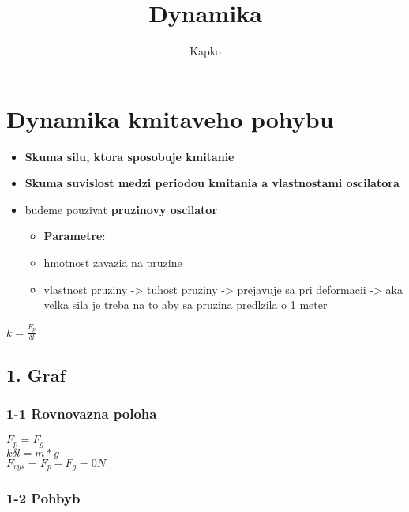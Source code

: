 \documentclass[
]{article}
\title{Dynamika}
\author{Kapko}
\date{}
\providecommand{\tightlist}{%
  \setlength{\itemsep}{0pt}\setlength{\parskip}{0pt}}
\begin{document}
\maketitle

\hypertarget{dynamika-kmitaveho-pohybu}{%
\section{Dynamika kmitaveho pohybu}\label{dynamika-kmitaveho-pohybu}}

\begin{itemize}
\tightlist
\item
  \textbf{Skuma silu, ktora sposobuje kmitanie}
\item
  \textbf{Skuma suvislost medzi periodou kmitania a vlastnostami
  oscilatora}
\item
  budeme pouzivat \textbf{pruzinovy oscilator}

  \begin{itemize}
  \tightlist
  \item
    \textbf{Parametre}:
  \item
    hmotnost zavazia na pruzine
  \item
    vlastnost pruziny -\textgreater{} tuhost pruziny -\textgreater{}
    prejavuje sa pri deformacii -\textgreater{} aka velka sila je treba
    na to aby sa pruzina predlzila o 1 meter
  \end{itemize}
\end{itemize}

\(k = \frac{F_p}{\delta l}\)\\

\hypertarget{graf}{%
\subsection{1. Graf}\label{graf}}

\hypertarget{rovnovazna-poloha}{%
\subsubsection{1-1 Rovnovazna poloha}\label{rovnovazna-poloha}}

\(F_p = F_g\)\\
\(k \delta l = m * g\)\\
\(F_{vys} = F_p - F_g = 0 N\)\\

\hypertarget{pohbyb}{%
\subsubsection{1-2 Pohbyb}\label{pohbyb}}
\end{document}
